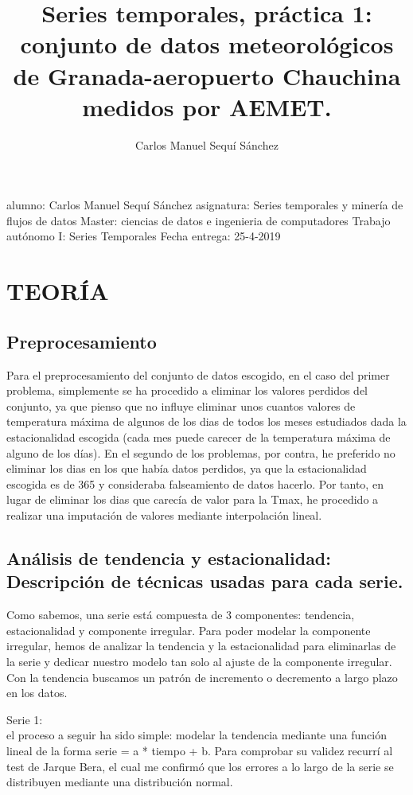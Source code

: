 \documentclass[]{article}
\title{Series temporales, práctica 1: conjunto de datos meteorológicos de
Granada-aeropuerto Chauchina medidos por AEMET.}
\author{Carlos Manuel Sequí Sánchez}
\date{}
\begin{document}
\maketitle

alumno: Carlos Manuel Sequí Sánchez asignatura: Series temporales y
minería de flujos de datos Master: ciencias de datos e ingenieria de
computadores Trabajo autónomo I: Series Temporales Fecha entrega:
25-4-2019

\section{TEORÍA}

\subsection{Preprocesamiento}

Para el preprocesamiento del conjunto de datos escogido, en el caso del
primer problema, simplemente se ha procedido a eliminar los valores
perdidos del conjunto, ya que pienso que no influye eliminar unos
cuantos valores de temperatura máxima de algunos de los dias de todos
los meses estudiados dada la estacionalidad escogida (cada mes puede
carecer de la temperatura máxima de alguno de los días). En el segundo
de los problemas, por contra, he preferido no eliminar los dias en los
que había datos perdidos, ya que la estacionalidad escogida es de 365 y
consideraba falseamiento de datos hacerlo. Por tanto, en lugar de
eliminar los dias que carecía de valor para la Tmax, he procedido a
realizar una imputación de valores mediante interpolación lineal.

\subsection{Análisis de tendencia y estacionalidad: Descripción de técnicas usadas para cada serie.}

Como sabemos, una serie está compuesta de 3 componentes: tendencia,
estacionalidad y componente irregular. Para poder modelar la componente
irregular, hemos de analizar la tendencia y la estacionalidad para
eliminarlas de la serie y dedicar nuestro modelo tan solo al ajuste de
la componente irregular. Con la tendencia buscamos un patrón de
incremento o decremento a largo plazo en los datos.

Serie 1:\\
el proceso a seguir ha sido simple: modelar la tendencia mediante una
función lineal de la forma serie = a * tiempo + b. Para comprobar su
validez recurrí al test de Jarque Bera, el cual me confirmó que los
errores a lo largo de la serie se distribuyen mediante una distribución
normal.
\end{document}
